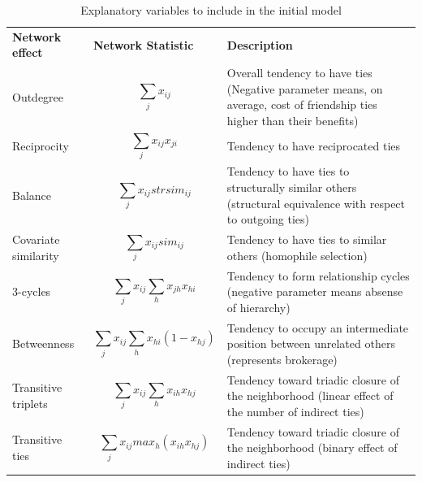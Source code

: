 \documentclass{acm_proc_article-sp}
\begin{document}
\begin{table}[!ht]
\centering
\caption{Explanatory variables to include in the initial model \cite{Steglich}}
\label{tableCovariates}
\begin{tabular}{m{} m{} m{}} 
\hline\noalign{\smallskip}
\textbf{Network effect} & \textbf{Network Statistic} & \textbf{Description} \\
\noalign{\smallskip}\hline\noalign{\smallskip}
Outdegree & \begin{equation*} \sum_j x_{ij} \end{equation*} & Overall tendency to have ties (Negative parameter means, on average, cost of friendship ties higher than their benefits) \\ 
Reciprocity & \begin{equation*} \sum_j x_{ij} x_{ji} \end{equation*} & Tendency to have reciprocated ties \\ 
Balance & \begin{equation*} \sum_j x_{ij}strsim_{ij} \end{equation*} & Tendency to have ties to structurally similar others (structural equivalence with respect to outgoing ties) \\ 
Covariate similarity & \begin{equation*} \sum_j x_{ij} sim_{ij} \end{equation*} & Tendency to have ties to similar others (homophile selection) \\ 
3-cycles & \begin{equation*} \sum_j x_{ij} \sum_h x_{jh}x_{hi} \end{equation*} & Tendency to form relationship cycles (negative parameter means absense of hierarchy) \\
Betweenness & \begin{equation*} \sum_j x_{ij} \sum_h x_{hi}(1 - x_{hj}) \end{equation*} & Tendency to occupy an intermediate position between unrelated others (represents brokerage) \\ 
Transitive triplets & \begin{equation*} \sum_j x_{ij} \sum_h x_{ih}x_{hj} \end{equation*} &  Tendency toward triadic closure of the neighborhood (linear effect of the number of indirect ties) \\
Transitive ties & \begin{equation*} \sum_j x_{ij} max_h (x_{ih}x_{hj}) \end{equation*} & Tendency toward triadic closure of the neighborhood (binary effect of indirect ties) \\

\end{tabular}
\end{table}
\end{document}
